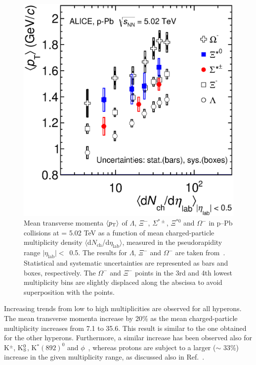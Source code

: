 \begin{figure}[htbp]
\begin{center}
\includegraphics[width=10.cm]{./Version1/FigChapter6/mpt/mpt_mult.eps}
\caption{Mean transverse momenta $\langle p_{\mathrm{T}}\rangle$ of $\Lambda$, $\Xi^{-}$, $\Sigma^{*\pm}$, $\Xi^{*0}$ 
  and $\Omega^{-}$ in p--Pb collisions at \snn = 5.02 TeV as a 
  function of mean charged-particle multiplicity density 
  $\langle$d$N_{\mathrm{ch}}$/d$\eta_{\mathrm{lab}}\rangle$, measured in the pseudorapidity range 
  $\mid\eta_{\mathrm{lab}}\mid <$~0.5. The results for $\Lambda$, $\Xi^{-}$ and $\Omega^{-}$ are taken 
  from~\cite{cite:lambda_pPb, cite:KphipPb, cite:Xi_pPb}. Statistical and systematic uncertainties are represented as bars 
  and boxes, respectively. The $\Omega^-$ and $\Xi^-$ points in the 3rd and 4th lowest multiplicity bins are slightly 
  displaced along the abscissa to avoid superposition with the \xis points.}
  \label{fig:mean_pt_vs_mult}
  \end{center}
\end{figure}


Increasing trends from low to high multiplicities are observed for all hyperons. The mean transverse momenta increase by 20\% as the mean charged-particle multiplicity increases from 7.1 to 35.6. This result is similar to the one obtained for the other hyperons. Furthermore, a similar increase has been observed also for K$^{\pm}$, K$_{\rm{S}}^{0}$, K$^{*}(892)^0$ and $\phi$~\cite{cite:KphipPb}, whereas protons are subject to a larger ($\sim$ 33\%) increase in the given multiplicity range, as discussed also in Ref.~\cite{cite:lambda_pPb}. 


